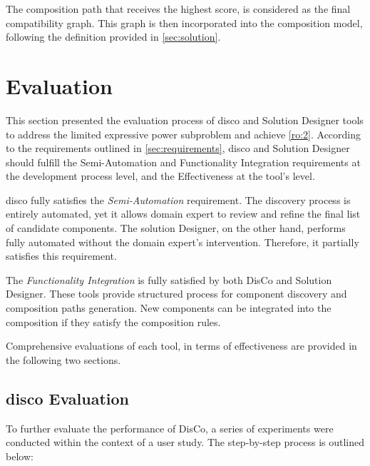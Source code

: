The composition path that receives the highest score, is considered as the final compatibility graph. This graph is then incorporated into the composition model, following the definition provided in \cref{sec:solution}.

\vspace{-10pt}
\hypertarget{sec:disco-evaluation}{%
\section{Evaluation}\label{sec:disco-evaluation}}
\vspace{10pt}
This section presented the evaluation process of \gls{disco} and Solution
Designer tools to address the limited expressive power subproblem and
achieve \cref{ro:2}. According to the requirements outlined in \cref{sec:requirements}, \gls{disco} and Solution Designer should fulfill the Semi-Automation and
Functionality Integration requirements at the development process level,
and the Effectiveness at the tool's level.

\gls{disco} fully satisfies the \emph{Semi-Automation} requirement. The
discovery process is entirely automated, yet it allows domain expert to
review and refine the final list of candidate components. The solution
Designer, on the other hand, performs fully automated without the domain
expert's intervention. Therefore, it partially satisfies this
requirement.

The \emph{Functionality Integration} is fully satisfied by both DisCo
and Solution Designer. These tools provide structured process for
component discovery and composition paths generation. New components can
be integrated into the composition if they satisfy the composition
rules.

Comprehensive evaluations of each tool, in terms of effectiveness are
provided in the following two sections.

\vspace{-10pt}
\hypertarget{sec:disco-evaluation-disco}{%
\subsection{\gls{disco} Evaluation}\label{sec:disco-evaluation-disco}}

To further evaluate the performance of DisCo, a series of experiments were conducted within the context of a user study. The step-by-step process is outlined below:

